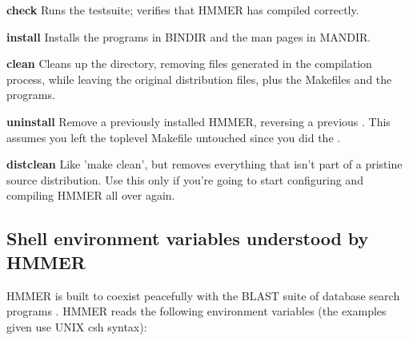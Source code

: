 \begin{wideitem}
\item[\textbf{check}] Runs the testsuite; verifies that HMMER has
compiled correctly.

\item[\textbf{install}] Installs the programs in BINDIR and
the man pages in MANDIR.

\item[\textbf{clean}] Cleans up the directory, removing files
generated in the compilation process, while leaving the original
distribution files, plus the Makefiles and the programs.

\item[\textbf{uninstall}] Remove a previously installed HMMER,
reversing a previous . This assumes you left the
toplevel Makefile untouched since you did the .

\item[\textbf{distclean}] Like 'make clean', but removes everything
that isn't part of a pristine source distribution. Use this only if
you're going to start configuring and compiling HMMER all over again.
\end{wideitem}

\subsection{Shell environment variables understood by HMMER}
\label{section:environment}

HMMER is built to coexist peacefully with the BLAST suite of database
search programs \cite{Altschul91,Altschul97}. HMMER reads the
following environment variables (the examples given use UNIX csh
syntax):

